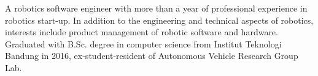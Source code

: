 

\begin{cvparagraph}
A robotics software engineer with more than a year of professional experience in robotics start-up. In addition to the engineering and technical aspects of robotics, interests include product management of robotic software and hardware. Graduated with B.Sc. degree in computer science from Institut Teknologi Bandung in 2016, ex-student-resident of Autonomous Vehicle Research Group Lab.




\end{cvparagraph}
